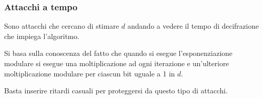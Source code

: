 \subsubsection{Attacchi a tempo}
Sono attacchi che cercano di stimare $d$ andando a vedere il tempo di decifrazione che impiega l'algoritmo.

Si basa sulla conoscenza del fatto che quando si esegue l'esponenziazione modulare si esegue una moltiplicazione
ad ogni iterazione e un'ulteriore moltiplicazione modulare per ciascun bit uguale a 1 in $d$.

Basta inserire ritardi casuali per proteggersi da questo tipo di attacchi.